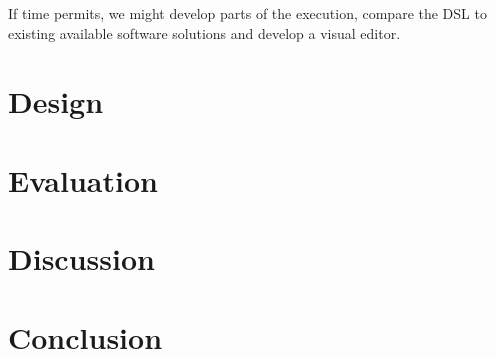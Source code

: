 \documentclass{llncs}
\begin{document}
If time permits, we might develop parts of the execution, compare the DSL to existing available software solutions and develop a visual editor.

\section{Design}\label{sec:design}

\section{Evaluation}\label{sec:evaluation}

\section{Discussion}\label{sec:discussion}

\section{Conclusion}\label{sec:conclusion}

{}

\end{document}
